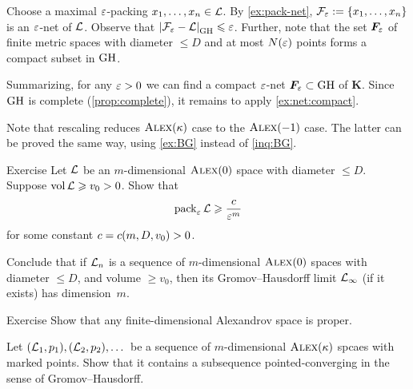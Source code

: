 Choose a maximal $\varepsilon$-packing $x_1,\z\dots,x_n\in \spc{L}$.
By \ref{ex:pack-net}, $\spc{F}_\eps\z\df\{x_1,\z\dots,x_n\}$ is an $\varepsilon$-net of $\mathcal{L}$.
Observe that $\dist{\spc{F}_\eps}{\spc{L}}{\GH}\le \eps$.
Further, note that the set $\bm{F}_\varepsilon$ of finite metric spaces with diameter $\le D$ and at most $N(\varepsilon)$ points forms a compact subset in $\operatorname{\rm GH}\nolimits$.

Summarizing, for any $\varepsilon>0$ we can find a compact $\varepsilon$-net $\bm{F}_\varepsilon\subset \operatorname{\rm GH}\nolimits$ of $\bm{K}$.
Since $\operatorname{\rm GH}\nolimits$ is complete (\ref{prop:complete}), it remains to apply \ref{ex:net:compact}.

Note that rescaling reduces $\textsc{Alex}(\kappa)$ case to the $\textsc{Alex}(-1)$ case.
The latter can be proved the same way, using \ref{ex:BG} instead of \ref{inq:BG}.
\qeds

\begin{thm}{Exercise}\label{ex:pack-vol}
Let $\mathcal{L}$ be an $m$-dimensional $\textsc{Alex}(0)$ space with diameter $\le D$.
Suppose $\operatorname{\rm vol}\nolimits\mathcal{L}\geqslant v_0>0$.
Show that 
\[\operatorname{\rm pack}\nolimits_\varepsilon\mathcal{L}\geqslant \frac{c}{\varepsilon^m}\]
for some constant $c=c(m,D,v_0)>0$.

Conclude that if $\mathcal{L}_n$ is a sequence of $m$-dimensional $\textsc{Alex}(0)$ spaces with diameter $\le D$, and volume $\ge v_0$, then its Gromov--Hausdorff limit $\mathcal{L}_\infty$ (if it exists) has dimension~$m$.%
\end{thm}

\begin{thm}{Exercise}\label{ex:diam-compact}
Show that any finite-dimensional Alexandrov space is proper.

Let $(\mathcal{L}_1,p_1),(\mathcal{L}_2,p_2),\dots$ be a sequence of $m$-dimensional $\textsc{Alex}(\kappa)$ spcaes with marked points.
Show that it contains a subsequence pointed-converging in the sense of Gromov--Hausdorff. 
\end{thm}
